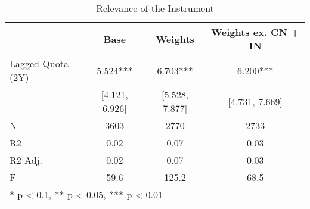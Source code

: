 \begin{table}

\caption{Relevance of the Instrument}
\centering
\begin{tabular}[t]{lccc}
\toprule
  & Base & Weights & Weights ex. CN + IN\\
\midrule
Lagged Quota (2Y) & 5.524*** & 6.703*** & 6.200***\\
 & [4.121, 6.926] & [5.528, 7.877] & [4.731, 7.669]\\
N & 3603 & 2770 & 2733\\
R2 & 0.02 & 0.07 & 0.03\\
R2 Adj. & 0.02 & 0.07 & 0.03\\
F & 59.6 & 125.2 & 68.5\\
\bottomrule
\multicolumn{4}{l}{\textsuperscript{} * p < 0.1, ** p < 0.05, *** p < 0.01}\\
\end{tabular}
\end{table}
